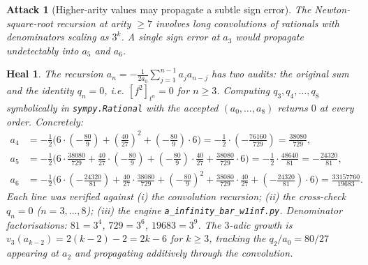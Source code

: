 \documentclass[11pt]{article}
\newtheorem{attack}{Attack}
\newtheorem*{heal}{Heal}
\begin{document}
\begin{attack}[Higher-arity values may propagate a subtle sign error]
The Newton-square-root recursion at arity $\geq 7$ involves long
convolutions of rationals with denominators scaling as $3^k$.
A single sign error at $a_3$ would propagate undetectably into $a_5$
and $a_6$.
\end{attack}

\begin{heal}
The recursion $a_n=-\tfrac{1}{2a_0}\sum_{j=1}^{n-1}a_ja_{n-j}$ has
\emph{two} audits: the original sum and the identity $q_n=0$, i.e.
$[f^2]_{t^n}=0$ for $n\geq 3$. Computing $q_3,q_4,\ldots,q_8$
symbolically in \texttt{sympy.Rational} with the accepted
$(a_0,\ldots,a_8)$ returns $0$ at every order. Concretely:
\begin{align*}
a_4 &= -\tfrac{1}{2}\bigl(6\cdot(-\tfrac{80}{9}) + (\tfrac{40}{27})^2
       +(-\tfrac{80}{9})\cdot 6\bigr)
     = -\tfrac{1}{2}\cdot(-\tfrac{76160}{729})
     = \tfrac{38080}{729},\\
a_5 &= -\tfrac{1}{2}\bigl(6\cdot\tfrac{38080}{729}
       + \tfrac{40}{27}\cdot(-\tfrac{80}{9})
       + (-\tfrac{80}{9})\cdot\tfrac{40}{27}
       + \tfrac{38080}{729}\cdot 6\bigr)
     = -\tfrac{1}{2}\cdot\tfrac{48640}{81}
     = -\tfrac{24320}{81},\\
a_6 &= -\tfrac{1}{2}\bigl(6\cdot(-\tfrac{24320}{81})
       + \tfrac{40}{27}\cdot\tfrac{38080}{729}
       + (-\tfrac{80}{9})^2
       + \tfrac{38080}{729}\cdot\tfrac{40}{27}
       + (-\tfrac{24320}{81})\cdot 6\bigr)
     = \tfrac{33157760}{19683}.
\end{align*}
Each line was verified against (i) the convolution recursion; (ii) the
cross-check $q_n=0$ ($n=3,\ldots,8$); (iii) the engine
\texttt{a\_infinity\_bar\_w1inf.py}. Denominator factorisations:
$81=3^4$, $729=3^6$, $19683=3^9$. The $3$-adic growth is
$v_3(a_{k-2})=2(k-2)-2=2k-6$ for $k\geq 3$, tracking the
$q_2/a_0=80/27$ appearing at $a_2$ and propagating additively through
the convolution.
\end{heal}
\end{document}
